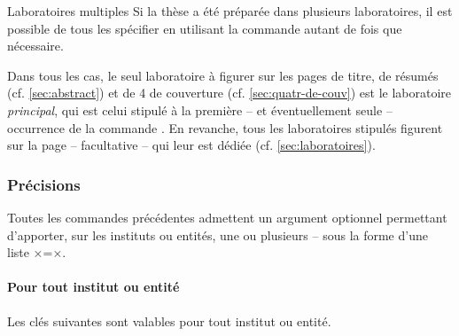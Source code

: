 %
\begin{dbremark}{Laboratoires multiples}{}
  Si la thèse a été préparée dans plusieurs laboratoires, il est possible de
  tous les spécifier en utilisant la commande  autant de
  fois que nécessaire.

  Dans tous les cas, le seul laboratoire à figurer sur les pages de titre, de
  résumés (cf. \vref{sec:abstract}) et de 4\ieme{} de couverture
  (cf. \vref{sec:quatr-de-couv}) est le laboratoire \emph{principal}, qui est
  celui stipulé à la première -- et éventuellement seule -- occurrence de la
  commande . En revanche, tous les laboratoires stipulés
  figurent sur la page -- facultative -- qui leur est dédiée
  (cf. \vref{sec:laboratoires}).
\end{dbremark}

\subsubsection{Précisions}

Toutes les commandes précédentes admettent un argument optionnel permettant
d'apporter, sur les instituts ou entités, une ou plusieurs 
-- sous la forme d'une liste ×=×.
%
\paragraph{Pour tout institut ou entité}

Les clés suivantes\syntaxeoptions{} sont valables pour tout institut ou entité.

